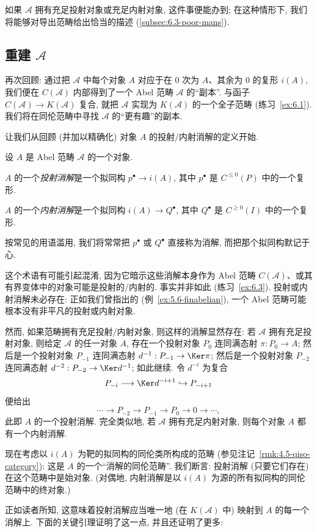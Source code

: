如果 $\mathcal{A}$ 拥有充足投射对象或充足内射对象, 这件事便能办到; 在这种情形下, 我们将能够对导出范畴给出恰当的描述 (\ref{subsec:6.3-poor-mans}).

\subsection{重建 \texorpdfstring{$\mathcal{A}$}{A}}
\label{subsec:6.1-recovering-A}

再次回顾: 通过把 $\mathcal{A}$ 中每个对象 $A$ 对应于在 $0$ 次为 $A$、其余为 $0$ 的复形 $i(A)$, 我们便在 $C(\mathcal{A})$ 内部得到了一个 Abel 范畴 $\mathcal{A}$ 的``副本''. 与函子 $C(\mathcal{A})\to K(\mathcal{A})$ 复合, 就把 $\mathcal{A}$ 实现为 $K(\mathcal{A})$ 的一个全子范畴 (练习~\ref{ex:6.1}). 我们将在同伦范畴中寻找 $\mathcal{A}$ 的``更有趣''的副本.

让我们从回顾 (并加以精确化) 对象 $A$ 的投射/内射消解的定义开始.

\begin{definition}\label{def:6.1-resolution}
设 $A$ 是 Abel 范畴 $\mathcal{A}$ 的一个对象.

$A$ 的一个\emph{投射消解}是一个拟同构 $p^\bullet\to i(A)$, 其中 $p^\bullet$ 是 $C^{\leq 0}(P)$ 中的一个复形.

$A$ 的一个\emph{内射消解}是一个拟同构 $i(A)\to Q^\bullet$, 其中 $Q^\bullet$ 是 $C^{\geq 0}(I)$ 中的一个复形.

按常见的用语滥用, 我们将常常把 $p^\bullet$ 或 $Q^\bullet$ 直接称为消解, 而把那个拟同构默记于心.
\end{definition}

\begin{remark}\label{rmk:6.2-terminology}
这个术语有可能引起混淆, 因为它暗示这些消解本身作为 Abel 范畴 $C(\mathcal{A})$、或其有界变体中的对象可能是投射的/内射的. 事实并非如此 (练习~\ref{ex:6.3}). 投射或内射消解未必存在: 正如我们曾指出的 (例~\ref{ex:5.6-finabelian}), 一个 Abel 范畴可能根本没有非平凡的投射或内射对象.

然而, 如果范畴拥有充足投射/内射对象, 则这样的消解显然存在: 若 $\mathcal{A}$ 拥有充足投射对象, 则给定 $\mathcal{A}$ 的任一对象 $A$, 存在一个投射对象 $P_0$ 连同满态射 $\pi:P_0\to A$; 然后是一个投射对象 $P_{-1}$ 连同满态射 $d^{-1}:P_{-1}\to\Ker\pi$; 然后是一个投射对象 $P_{-2}$ 连同满态射 $d^{-2}:P_{-2}\to\Ker d^{-1}$; 如此继续. 令 $d^{-i}$ 为复合
\[
P_{-i}\longrightarrow\Ker d^{-i+1}\hookrightarrow P_{-i+1}
\]
便给出
\[
\cdots\longrightarrow P_{-2}\longrightarrow P_{-1}\longrightarrow P_0\longrightarrow 0\longrightarrow\cdots,
\]
此即 $A$ 的一个投射消解. 完全类似地, 若 $\mathcal{A}$ 拥有充足内射对象, 则每个对象 $A$ 都有一个内射消解.

现在考虑以 $i(A)$ 为靶的拟同构的同伦类所构成的范畴 (参见注记~\ref{rmk:4.5-qiso-category}): 这是 $A$ 的一个``消解的同伦范畴''. 我们断言: 投射消解 (只要它们存在) 在这个范畴中是始对象. (对偶地, 内射消解是以 $i(A)$ 为源的所有拟同构的同伦范畴中的终对象.)

正如读者所知, 这意味着投射消解应当唯一地 (在 $K(\mathcal{A})$ 中) 映射到 $A$ 的每一个消解上. 下面的关键引理证明了这一点, 并且还证明了更多:
\end{remark}

